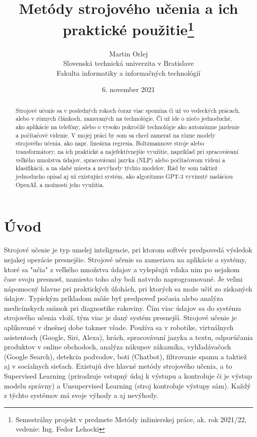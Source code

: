 \documentclass[8pt,twoside,slovak,a4paper]{article}
\title{Metódy strojového učenia a ich praktické použitie\thanks{Semestrálny projekt v predmete Metódy inžinierskej práce, ak. rok 2021/22, vedenie: Ing. Fedor Lehocki}}
\author{Martin Orlej\\[2pt]
	{\small Slovenská technická univerzita v Bratislave}\\
	{\small Fakulta informatiky a informačných technológií}\\
	}
\date{\small 6. november 2021}
\begin{document}
\maketitle

\newpage

\begin{abstract}
Strojové učenie sa v posledných rokoch čoraz viac spomína či už vo vedeckých prácach, alebo v rôznych článkoch, zameraných na technológie. Či už ide o niečo jednoduché, ako aplikácie na telefóny, alebo o vysoko pokročilé technológie ako autonómne jazdenie a počítačové videnie.\newline \hspace*{0.4cm} V mojej práci by som sa chcel zamerať na rôzne modely strojového učenia, ako napr. lineárna regresia, Boltzmannove stroje alebo transformátory, na ich praktické a najefektívnejšie využitie, napríklad pri spracovávaní veľkého množstva údajov, spracovávaní jazyka (NLP) alebo počítačovom videní a klasifikácii, a na slabé miesta a nevýhody týchto modelov. Rád by som taktiež jednoducho opísal aj už existujúci systém, ako algoritmus GPT-3 vyvinutý nadáciou OpenAI, a možnosti jeho využitia.
\end{abstract}

\section{Úvod} \label {uvod}
Strojové učenie je typ umelej inteligencie, pri ktorom softvér predpovedá výsledok nejakej operácie presnejšie. Strojové učenie sa zameriava na aplikácie a systémy, ktoré sa "učia" z veľkého množstva údajov a vylepšujú vďaka nim po nejakom čase svoju presnosť, namiesto toho aby boli natvrdo naprogramované. Je veľmi nápomocný hlavne pri praktických úlohách, pri ktorých sa može učiť zo získaných údajov. Typickým príkladom môže byť predpoveď počasia alebo analýza medicínskych snímok pri diagnostike rakoviny.
Čím viac údajov sa do systému strojového učenia vloží, tým viac je daný systém presnejší. Strojové učenie je aplikované  v dnešnej dobe takmer všade. Používa sa v robotike, virtuálnych asistentoch (Google, Siri, Alexa), hrách, spracovávaní jazyka a textu, odporúčania produktov v online obchodoch, analýza nákupov zákazníka, vyhľadávačoch (Google Search), detekcia podvodov, boti (Chatbot), filtrovanie spamu a taktiež aj v socíalnych sieťach. 
Existujú dve hlavné metódy strojového učenia, a to Supervised Learning (priradzuje vstupný údaj k výstupu a kontroluje či je výstup modelu správny) a Unsupervised Learning (stroj kontroluje výstupy sám). Každý z týchto systémov má svoje výhody a aj nevýhody.
\end{document}
